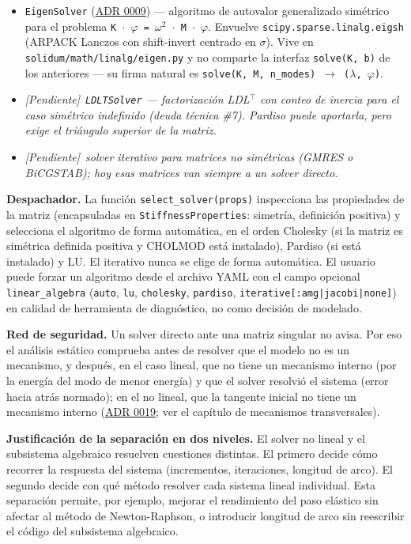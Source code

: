 \documentclass[11pt,oneside]{report}
\newcommand{\pendiente}[1]{\textcolor{pendienteorange}{\textit{[Pendiente]}~\textcolor{pendienteorange}{\textit{#1}}}}
\begin{document}
\begin{itemize}
  \item \texttt{EigenSolver} (\hyperref[adr:0009]{ADR 0009}) --- algoritmo de autovalor generalizado simétrico para el problema \texttt{K \ensuremath{\cdot} \ensuremath{\varphi} = \ensuremath{\omega}\ensuremath{^{2}} \ensuremath{\cdot} M \ensuremath{\cdot} \ensuremath{\varphi}}. Envuelve \texttt{scipy.\allowbreak{}sparse.\allowbreak{}linalg.\allowbreak{}eigsh} (ARPACK Lanczos con shift-invert centrado en \texttt{\ensuremath{\sigma}}). Vive en \texttt{solidum/\allowbreak{}math/\allowbreak{}linalg/\allowbreak{}eigen.\allowbreak{}py} y no comparte la interfaz \texttt{solve(K, b)} de los anteriores --- su firma natural es \texttt{solve(K, M, n\_\allowbreak{}modes) \ensuremath{\to} (\ensuremath{\lambda}, \ensuremath{\varphi})}.
  \item \pendiente{\texttt{LDLTSolver} --- factorización LDL\ensuremath{^{\top}} con conteo de inercia para el caso simétrico indefinido (deuda técnica \#7). Pardiso puede aportarla, pero exige el triángulo superior de la matriz.}
  \item \pendiente{solver iterativo para matrices no simétricas (GMRES o BiCGSTAB); hoy esas matrices van siempre a un solver directo.}
\end{itemize}

\textbf{Despachador.} La función \texttt{select\_\allowbreak{}solver(props)} inspecciona las propiedades de la matriz (encapsuladas en \texttt{StiffnessProperties}: simetría, definición positiva) y selecciona el algoritmo de forma automática, en el orden Cholesky (si la matriz es simétrica definida positiva y CHOLMOD está instalado), Pardiso (si está instalado) y LU. El iterativo nunca se elige de forma automática. El usuario puede forzar un algoritmo desde el archivo YAML con el campo opcional \texttt{linear\_algebra} (\texttt{auto}, \texttt{lu}, \texttt{cholesky}, \texttt{pardiso}, \texttt{iterative[:amg|jacobi|none]}) en calidad de herramienta de diagnóstico, no como decisión de modelado.

\textbf{Red de seguridad.} Un solver directo ante una matriz singular no avisa. Por eso el análisis estático comprueba antes de resolver que el modelo no es un mecanismo, y después, en el caso lineal, que no tiene un mecanismo interno (por la energía del modo de menor energía) y que el solver resolvió el sistema (error hacia atrás normado); en el no lineal, que la tangente inicial no tiene un mecanismo interno (\hyperref[adr:0019]{ADR 0019}; ver el capítulo de mecanismos transversales).

\textbf{Justificación de la separación en dos niveles.} El solver no lineal y el subsistema algebraico resuelven cuestiones distintas. El primero decide cómo recorrer la respuesta del sistema (incrementos, iteraciones, longitud de arco). El segundo decide con qué método resolver cada sistema lineal individual. Esta separación permite, por ejemplo, mejorar el rendimiento del paso elástico sin afectar al método de Newton-Raphson, o introducir longitud de arco sin reescribir el código del subsistema algebraico.
\end{document}
